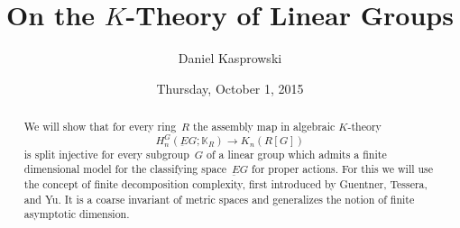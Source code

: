\documentclass{UAmathtalk}
\author{Daniel Kasprowski}
\title{On the $K$-Theory of Linear Groups}
\date{Thursday, October 1, 2015}
\begin{document}
\maketitle

\begin{abstract}
We will show that for every ring~$R$ the assembly map in algebraic $K$-theory
\[H_n^G(\underbar EG;\mathbb K_R)\to K_n(R[G])\]
is split injective for every subgroup~$G$ of a linear group which admits a finite dimensional model for the classifying space~$\underbar EG$ for proper actions.
For this we will use the concept of finite decomposition complexity, first introduced by Guentner, Tessera, and Yu.
It is a coarse invariant of metric spaces and generalizes the notion of finite asymptotic dimension.
\end{abstract}
\end{document}
